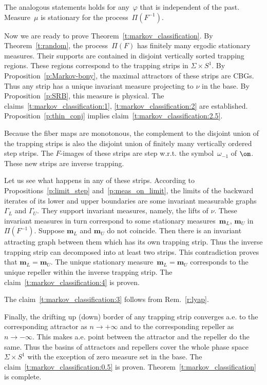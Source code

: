 \documentclass[a4paper,12pt]{amsart}
\begin{document}
\begin{Rem}
The analogous statements holds for any~$\varphi$ that is independent of the past. Measure~$\mu$ is stationary for the process~$\Pi(F^{-1})$.
\end{Rem}

Now we are ready to prove Theorem~\ref{t:markov_classification}.
By Theorem~\ref{t:random}, the process~$\Pi(F)$ has finitely many ergodic stationary measures. Their supports are contained in disjoint vertically sorted trapping regions. These regions correspond to the trapping strips in $\Sigma \times S^1$. By Proposition~\ref{p:Markov-bony}, the maximal attractors of these strips are CBGs. Thus any strip has a unique invariant measure projecting to $\nu$ in the base. By Proposition~\ref{p:SRB}, this measure is physical. The claims~\ref{t:markov_classification:1}, \ref{t:markov_classification:2} are established. Proposition~\ref{p:thin_conj} implies claim~\ref{t:markov_classification:2.5}.

Because the fiber maps are monotonous, the complement to the disjoint union of the trapping strips is also the disjoint union of finitely many vertically ordered step strips. The $F$-images of these strips are step w.r.t. the symbol~$\omega_{-1}$ of $\om$. These new strips are inverse trapping.

Let us see what happens in any of these strips. According to Propositions~\ref{p:limit_step} and~\ref{p:meas_on_limit}, the limits of the backward iterates of its lower and upper boundaries are some invariant measurable graphs~$\Gamma_L$ and $\Gamma_U$. They support invariant measures, namely, the lifts of $\nu$. These invariant measures in turn correspond to some stationary measures~$\mathbf{m}_L$, $\mathbf{m}_U$ in~$\Pi(F^{-1})$. Suppose $\mathbf{m}_L$ and $\mathbf{m}_U$ do not coincide. Then there is an invariant attracting graph between them which has its own trapping strip. Thus the inverse trapping strip can decomposed into at least two strips. This contradiction proves that $\mathbf{m}_L = \mathbf{m}_U$. The unique stationary measure~$\mathbf{m}_L = \mathbf{m}_U$ corresponds to the unique repeller within the inverse trapping strip. The claim~\ref{t:markov_classification:4} is proven.

The claim~\ref{t:markov_classification:3} follows from Rem.~\ref{r:lyap}.

Finally, the drifting up (down) border of any trapping strip converges a.e. to the corresponding attractor as $n \to +\infty$ and to the corresponding repeller as~$n \to -\infty$. This makes a.e. point between the attractor and the repeller do the same. Thus the basins of attractors and repellers cover the whole phase space~$\Sigma \times S^1$ with the exception of zero measure set in the base. The claim~\ref{t:markov_classification:0.5} is proven. Theorem~\ref{t:markov_classification} is complete.
\end{document}
